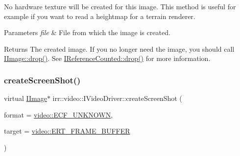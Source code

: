 No hardware texture will be created for this image. This method is useful for example if you want to read a heightmap for a terrain renderer. 
\begin{DoxyParams}{Parameters}
{\em file} & File from which the image is created. \\
\hline
\end{DoxyParams}
\begin{DoxyReturn}{Returns}
The created image. If you no longer need the image, you should call \hyperlink{classirr_1_1IReferenceCounted_a03856a09355b89d178090c4a5f738543}{I\+Image\+::drop()}. See \hyperlink{classirr_1_1IReferenceCounted_a03856a09355b89d178090c4a5f738543}{I\+Reference\+Counted\+::drop()} for more information. 
\end{DoxyReturn}
\mbox{\label{classirr_1_1video_1_1IVideoDriver_a50db0e36d406089167facf70b2eb4706}} 
\subsubsection{\texorpdfstring{create\+Screen\+Shot()}{createScreenShot()}\hspace{0.1cm}{\footnotesize\ttfamily [1/2]}}
{\footnotesize\ttfamily virtual \hyperlink{classirr_1_1video_1_1IImage}{I\+Image}$\ast$ irr\+::video\+::\+I\+Video\+Driver\+::create\+Screen\+Shot (\begin{DoxyParamCaption}\item[{\hyperlink{namespaceirr_1_1video_a1d5e487888c32b1674a8f75116d829ed}{video\+::\+E\+C\+O\+L\+O\+R\+\_\+\+F\+O\+R\+M\+AT}}]{format = {\ttfamily \hyperlink{namespaceirr_1_1video_a1d5e487888c32b1674a8f75116d829eda8d25e5e1e9c83f95c4f7d48e11688a51}{video\+::\+E\+C\+F\+\_\+\+U\+N\+K\+N\+O\+WN}},  }\item[{\hyperlink{namespaceirr_1_1video_a5b61a3f2bd5d458f76f2eb20b0f40972}{video\+::\+E\+\_\+\+R\+E\+N\+D\+E\+R\+\_\+\+T\+A\+R\+G\+ET}}]{target = {\ttfamily \hyperlink{namespaceirr_1_1video_a5b61a3f2bd5d458f76f2eb20b0f40972a232d0f49241a378e11d4a37e752d3d73}{video\+::\+E\+R\+T\+\_\+\+F\+R\+A\+M\+E\+\_\+\+B\+U\+F\+F\+ER}} }\end{DoxyParamCaption})\hspace{0.3cm}{\ttfamily [pure virtual]}}



